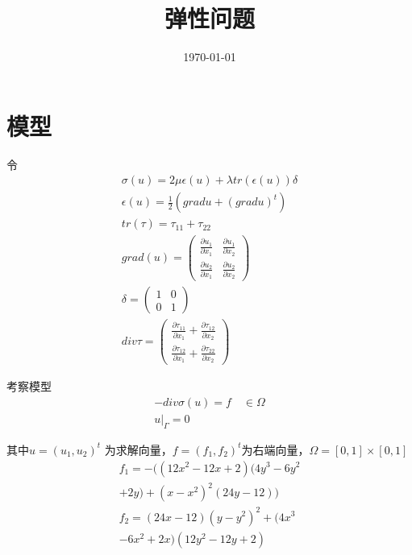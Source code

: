 \documentclass[UTF8,titlepage,twocolumn]{ctexart}
\title{弹性问题}
\date{\today}
\begin{document}
\maketitle

\section{模型}

令
$$
\begin{matrix}
	\sigma(u) = 2 \mu \epsilon(u) + \lambda tr(\epsilon(u)) \delta \\
	\epsilon(u) = \frac{1}{2} (grad u + (grad u)^t) \\
	tr(\tau) = \tau_{11} + \tau_{22} \\
	grad(u) = \begin{pmatrix}
		\frac{\partial u_1}{\partial x_1} & \frac{\partial u_1}{\partial x_2} \\
		\frac{\partial u_2}{\partial x_1} &
		\frac{\partial u_2}{\partial x_2}
	\end{pmatrix} \\
	\delta = \begin{pmatrix}
		1 & 0 \\
		0 & 1
	\end{pmatrix} \\
	div \tau = \begin{pmatrix}
		\frac{\partial \tau_{11}}{\partial x_1} + \frac{\partial \tau_{12}}{\partial x_2} \\
		\frac{\partial \tau_{12}}{\partial x_1} + \frac{\partial \tau_{22}}{\partial x_2}
	\end{pmatrix}
\end{matrix}
$$

考察模型
$$
\begin{matrix}
	-div \sigma(u) = f \quad \in \Omega  \\
	u |_{\Gamma} = 0
\end{matrix}
$$ 
\par
其中$ u = (u_1,u_2)^t $ 为求解向量，$ f = (f_1,f_2)^t $为右端向量，$ \Omega = [0,1] \times [0,1] $
$$
\begin{matrix}
	f_1 = -((12 x^2 - 12 x + 2) (4 y^3 - 6 y^2 
	\\ 
	+ 2 y) + (x - x^2)^2 (24 y - 12)) 
	\\
	f_2 = (24 x - 12)(y - y^2)^2 + (4 x^3 
	\\
	- 6 x^2 + 2 x) (12 y^2 - 12 y + 2)
\end{matrix}
$$
\end{document}
